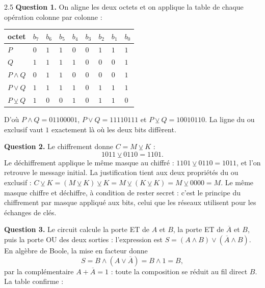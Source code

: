 \begin{corrige}{2.5}
\textbf{Question 1.} On aligne les deux octets et on applique la table de chaque opération colonne par colonne :

\begin{center}
\begin{tabular}{C{1.9cm}C{0.42cm}C{0.42cm}C{0.42cm}C{0.42cm}C{0.42cm}C{0.42cm}C{0.42cm}C{0.42cm}}
\toprule
{}octet & $b_7$ & $b_6$ & $b_5$ & $b_4$ & $b_3$ & $b_2$ & $b_1$ & $b_0$ \\
\midrule
$P$ & $0$ & $1$ & $1$ & $0$ & $0$ & $1$ & $1$ & $1$ \\
$Q$ & $1$ & $1$ & $1$ & $1$ & $0$ & $0$ & $0$ & $1$ \\
\midrule
$P \land Q$ & $0$ & $1$ & $1$ & $0$ & $0$ & $0$ & $0$ & $1$ \\
$P \lor Q$ & $1$ & $1$ & $1$ & $1$ & $0$ & $1$ & $1$ & $1$ \\
$P \veebar Q$ & $1$ & $0$ & $0$ & $1$ & $0$ & $1$ & $1$ & $0$ \\
\bottomrule
\end{tabular}
\end{center}
D'où $P \land Q = 01100001$, $P \lor Q = 11110111$ et $P \veebar Q = 10010110$. La ligne du ou exclusif vaut $1$ exactement là où les deux bits diffèrent.

\textbf{Question 2.} Le chiffrement donne $C = M \veebar K$ :
\[
1011 \veebar 0110 = 1101.
\]
Le déchiffrement applique le même masque au chiffré : $1101 \veebar 0110 = 1011$, et l'on retrouve le message initial. La justification tient aux deux propriétés du ou exclusif : $C \veebar K = (M \veebar K) \veebar K = M \veebar (K \veebar K) = M \veebar 0000 = M$. Le même masque chiffre et déchiffre, à condition de rester secret : c'est le principe du chiffrement par masque appliqué aux bits, celui que les réseaux utilisent pour les échanges de clés.

\textbf{Question 3.} Le circuit calcule la porte ET de $A$ et $B$, la porte ET de $\overline{A}$ et $B$, puis la porte OU des deux sorties : l'expression est $S = (A \land B) \lor (\overline{A} \land B)$. En algèbre de Boole, la mise en facteur donne
\[
S = B \land (A \lor \overline{A}) = B \land 1 = B,
\]
par la complémentaire $A + \overline{A} = 1$ : toute la composition se réduit au fil direct $B$. La table confirme :


\end{corrige}
